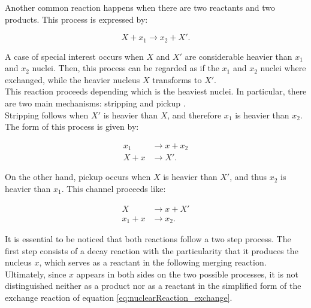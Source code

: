 \documentclass[openany]{book}
\begin{document}
Another common reaction happens when there are two reactants and two products. This process is expressed by:

\begin{equation}  \label{eq:nuclearReaction_exchange}
	X +  x_1 \rightarrow x_2 + X'.
\end{equation}

A case of special interest occurs when $X$ and $X'$ are considerable heavier than $x_1$ and $x_2$ nuclei. Then, this process can be regarded as if the $x_1$ and $x_2$ nuclei where exchanged, while the heavier nucleus $X$ transforms to $X'$. \\

This reaction proceeds depending which is the heaviest nuclei. In particular, there are two main mechanisms: stripping and pickup \cite{xu_takahashi_goriely_arnould_ohta_utsunomiya_2013}.\\ 

Stripping follows when $X'$ is heavier than $X$, and therefore $x_1$ is heavier than $x_2$. The form of this process is given by:

\begin{equation}  \label{eq:nuclearReaction_exchange_stripping}
	\begin{split}
		x_1		&\rightarrow x  +  x_2 \\
		X + x 	&\rightarrow X'.
	\end{split}
\end{equation}

On the other hand, pickup  occurs when $X$ is heavier than $X'$, and thus $x_2$ is heavier than $x_1$. This channel proceeds like:
 
 \begin{equation}  \label{eq:nuclearReaction_exchange_pickup}
 	\begin{split}
 		X 			&\rightarrow x + X' \\
 		x_1 + x  &\rightarrow x_2.
 	\end{split}
 \end{equation}

It is essential to be noticed that both reactions follow a two step process. The first step consists of a decay reaction with the particularity that it produces the nucleus $x$, which serves as a reactant in the following merging reaction. Ultimately, since $x$ appears in both sides on the two possible processes,  it is not distinguished neither as a product nor as a reactant in the simplified form of the exchange reaction of equation \ref{eq:nuclearReaction_exchange}. \\
\end{document}
